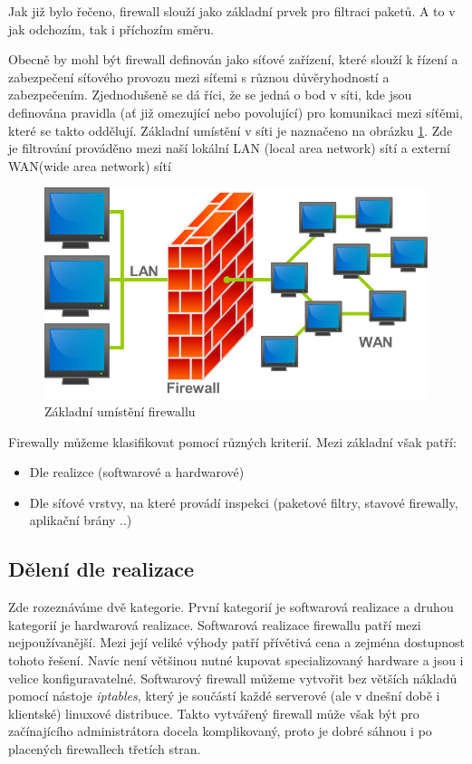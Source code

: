 \documentclass[11pt,a4paper]{article}
\begin{document}
Jak již bylo řečeno, firewall slouží jako základní prvek pro filtraci paketů. A to v jak odchozím, tak i příchozím směru.

Obecně by mohl být firewall definován jako síťové zařízení, které slouží k řízení a zabezpečení síťového provozu mezi síťemi s různou důvěryhodností a zabezpečením. Zjednodušeně se dá říci, že se jedná o bod v síti, kde jsou definována pravidla (ať již omezující nebo povolující) pro komunikaci mezi síťěmi, které se takto oddělují. Základní umístění v síti je naznačeno na obrázku \ref{pic:firewall_base}. Zde je filtrování prováděno mezi naší lokální LAN (local area network) sítí a externí WAN(wide area network) sítí

\begin{figure}[ht]
	\center
	\includegraphics[scale=0.3]{./pict/firewall.png}
	\caption{Základní umístění firewallu \cite{ref:wiki_firewall}}
	\label{pic:firewall_base}
\end{figure}

Firewally můžeme klasifikovat pomocí různých kriterií. Mezi základní však patří:
\begin{itemize}
	\item Dle realizce (softwarové a hardwarové)
	\item Dle síťové vrstvy, na které provádí inspekci (paketové filtry, stavové firewally, aplikační brány ..)
\end{itemize} 


\subsection{Dělení dle realizace}
Zde rozeznáváme dvě kategorie. První kategorií je softwarová realizace a druhou kategorií je hardwarová realizace. Softwarová realizace firewallu patří mezi nejpoužívanější. Mezi její veliké výhody patří přívětivá cena a zejména dostupnost tohoto řešení. Navíc není většinou nutné kupovat specializovaný hardware a jsou i velice konfiguravatelné. Softwarový firewall můžeme vytvořit bez větších nákladů pomocí nástoje \textit{iptables}, který je součástí každé serverové (ale v dnešní době i klientské) linuxové distribuce. Takto vytvářený firewall může však být pro začínajícího administrátora docela komplikovaný, proto je dobré sáhnou i po placených firewallech třetích stran.
\end{document}
